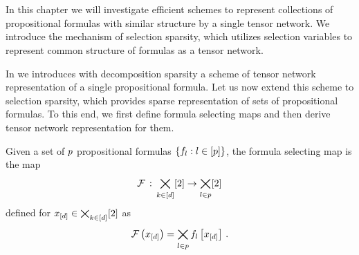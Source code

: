 \chapter{\chatextformulaSelection}\label{cha:formulaSelection}

In this chapter we will investigate efficient schemes to represent collections of propositional formulas with similar structure by a single tensor network.
We introduce the mechanism of selection sparsity, which utilizes selection variables to represent common structure of formulas as a tensor network.


In  we introduces with decomposition sparsity a scheme of tensor network representation of a single propositional formula.
Let us now extend this scheme to selection sparsity, which provides sparse representation of sets of propositional formulas.
To this end, we first define formula selecting maps and then derive tensor network representation for them.

\begin{definition}
    Given a set of $p$ propositional formulas $\{f_{l} : l\in[p]\}$, the formula selecting map is the map
    \begin{align*}
        \mathcal{F} \,:\, \bigtimes_{k\in[d]}[2] \rightarrow \bigtimes_{l\in p} [2]
    \end{align*}
    defined for $x_{[d]}\in\bigtimes_{k\in[d]}[2]$ as
    \begin{align*}
        \mathcal{F}\left(x_{[d]}\right)
        = \bigtimes_{l\in p} f_{l}\left[x_{[d]}\right] \, .
    \end{align*}
\end{definition}

